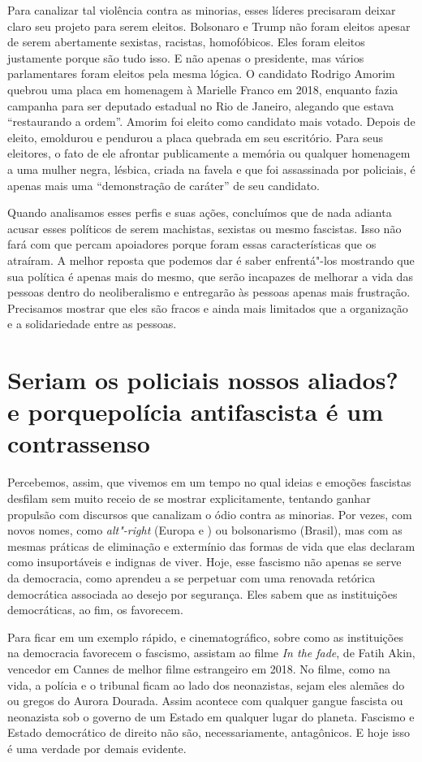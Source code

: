 Para canalizar tal violência contra as minorias, esses líderes precisaram deixar claro seu projeto para serem eleitos. Bolsonaro e Trump não foram eleitos apesar de serem abertamente sexistas, racistas, homofóbicos. Eles foram eleitos justamente porque são tudo isso. E não apenas o presidente, mas vários parlamentares foram eleitos pela mesma lógica. O candidato Rodrigo Amorim quebrou uma placa em homenagem à Marielle Franco em 2018, enquanto fazia campanha para ser deputado estadual no Rio de Janeiro, alegando que estava ``restaurando a ordem''. Amorim foi eleito como candidato mais votado. Depois de eleito, emoldurou e pendurou a placa quebrada em seu escritório. Para seus eleitores, o fato de ele afrontar publicamente a memória ou qualquer homenagem a uma mulher negra, lésbica, criada na favela e que foi assassinada por policiais, é apenas mais uma ``demonstração de caráter'' de seu candidato.

Quando analisamos esses perfis e suas ações, concluímos que de nada adianta acusar esses políticos de serem machistas, sexistas ou mesmo fascistas. Isso não fará com que percam apoiadores porque foram essas características que os atraíram. A melhor reposta que podemos dar é saber enfrentá"-los mostrando que sua política é apenas mais do mesmo, que serão incapazes de melhorar a vida das pessoas dentro do neoliberalismo e entregarão às pessoas apenas mais frustração. Precisamos mostrar que eles são fracos e ainda mais limitados que a organização e a solidariedade entre as pessoas.

\section{Seriam os policiais nossos aliados? e porque\break polícia antifascista é um contrassenso}

Percebemos, assim, que vivemos em um tempo no qual ideias e emoções fascistas desfilam sem muito receio de se mostrar explicitamente, tentando ganhar propulsão com discursos que canalizam o ódio contra as minorias. Por vezes, com novos nomes, como \emph{alt"-right} (Europa e ) ou bolsonarismo (Brasil), mas com as mesmas práticas de eliminação e extermínio das formas de vida que elas declaram como insuportáveis e indignas de viver. Hoje, esse fascismo não apenas se serve da democracia, como aprendeu a se perpetuar com uma renovada retórica democrática associada ao desejo por segurança. Eles sabem que as instituições democráticas, ao fim, os favorecem.

Para ficar em um exemplo rápido, e cinematográfico, sobre como as instituições na democracia favorecem o fascismo, assistam ao filme \emph{In the fade}, de Fatih Akin, vencedor em Cannes de melhor filme estrangeiro em 2018. No filme, como na vida, a polícia e o tribunal ficam ao lado dos neonazistas, sejam eles alemães do  ou gregos do Aurora Dourada. Assim acontece com qualquer gangue fascista ou neonazista sob o governo de um Estado em qualquer lugar do planeta. Fascismo e Estado democrático de direito não são, necessariamente, antagônicos. E hoje isso é uma verdade por demais evidente.

